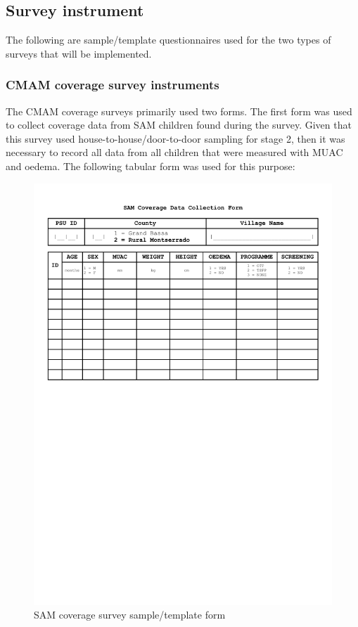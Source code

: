 \documentclass[12pt,a4paper]{article}
\begin{document}
\hypertarget{survey-instrument}{%
\subsection{Survey instrument}\label{survey-instrument}}

The following are sample/template questionnaires used for the two types of surveys that will be implemented.

\hypertarget{cmam-coverage-survey-instruments}{%
\subsubsection{CMAM coverage survey instruments}\label{cmam-coverage-survey-instruments}}

The CMAM coverage surveys primarily used two forms. The first form was used to collect coverage data from SAM children found during the survey. Given that this survey used house-to-house/door-to-door sampling for stage 2, then it was necessary to record all data from all children that were measured with MUAC and oedema. The following tabular form was used for this purpose:

\newpage

\begin{figure}[H]

{\centering \includegraphics[width=0.9\linewidth]{forms/samForm} 

}

\caption{SAM coverage survey sample/template form}\label{fig:samform}
\end{figure}
\end{document}
